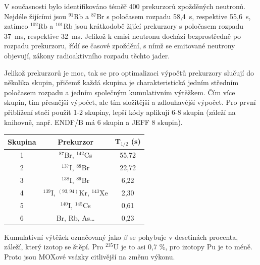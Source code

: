 V současnosti bylo identifikováno téměř 400 prekurzorů zpožděných neutronů. Nejdéle žijícími jsou $^{91}\text{Rb}$ a $^{87}\text{Br}$ s poločasem rozpadu 58,4~s, respektive 55,6~s, zatímco $^{102}\text{Rb}$ a $^{101}\text{Rb}$ jsou krátkodobě žijící prekurzory s poločasem rozpadu 37~ms, respektive 32~ms. Jelikož k emisi neutronu dochází bezprostředně po rozpadu prekurzoru, řídí se časové zpoždění, s nímž se emitované neutrony objevují, zákony radioaktivního rozpadu těchto jader.

Jelikož prekurzorů je moc, tak se pro optimalizaci výpočtů prekurzory slučují do několika skupin, přičemž každá skupina je charakteristická jedním středním poločasem rozpadu a jedním společným kumulativním výtěžkem. Čím více skupin, tím přesnější výpočet, ale tím složitější a zdlouhavější výpočet. Pro první přiblížení stačí použít 1-2 skupiny, lepší kódy aplikují 6-8 skupin (záleží na knihovně, např. ENDF/B má 6 skupin a JEFF 8 skupin).

\begin{table}[H]
    \centering
    \begin{tabular}{@{}ccc@{}}
    \toprule
    Skupina & Prekurzor                              & T$_{1/2}$ (s) \\ \midrule
    1       & $^{87}$Br, $^{142}$Cs                  & 55,72         \\
    2       & $^{137}$I, $^{88}$Br                   & 22,72         \\
    3       & $^{138}$I, $^{89}$Br                   & 6,22          \\
    4       & $^{139}$I, $^{(93, 94)}$Kr, $^{143}$Xe & 2,30          \\
    5       & $^{140}$I, $^{145}$Cs                  & 0,61          \\
    6       & Br, Rb, As…                            & 0,23          \\ \bottomrule
    \end{tabular}
\end{table}

Kumulativní výtěžek označovaný jako $\beta$ se pohybuje v desetinách procenta, záleží, který izotop se štěpí. Pro $^{235}$U je to asi 0,7 \%, pro izotopy Pu je to méně. Proto jsou MOXové vsázky citlivější na změnu výkonu.


